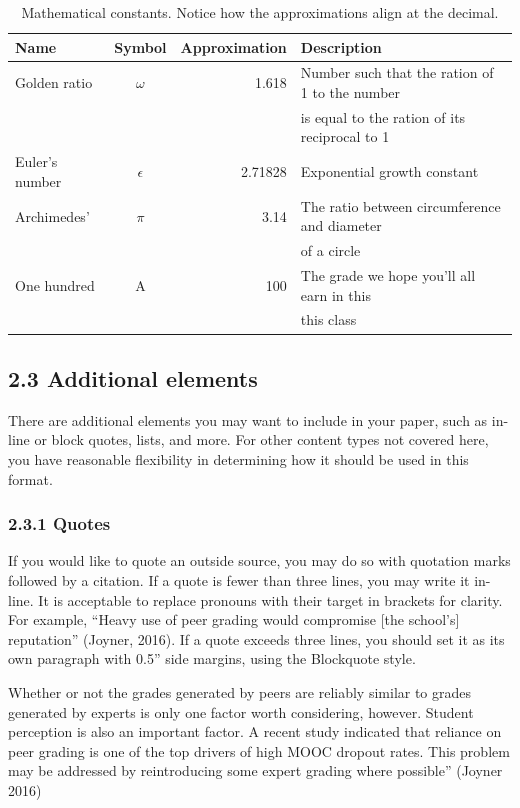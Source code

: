 {{{{\begin{table}[H]
  \centering
  \caption{Mathematical constants. Notice how the approximations align at the decimal.}
  \label{table:1}
  \footnotesize
  \begin{tabular}{l|c|r|l}
    \textbf{Name} & \textbf{Symbol} & \textbf{Approximation} & \textbf{Description}\\
    \hline
    Golden ratio & $\omega$ & 1.618 & Number such that the ration of 1 to the number\\
    & & & is equal to the ration of its reciprocal to 1\\
    \hline
    Euler's number & $\epsilon$ & 2.71828 & Exponential growth constant\\
    \hline
    Archimedes' & $\pi$ & 3.14 & The ratio between circumference and diameter\\
    & & & of a circle\\
    \hline
    One hundred & A\super{+} & 100 & The grade we hope you'll all earn in this\\
    & & & this class
  \end{tabular}
\end{table}

\subsection*{2.3 Additional elements}
There are additional elements you may want to include in your paper, such as in-line or block quotes, lists, and more. For other content types not covered here, you have reasonable flexibility in determining how it should be used in this format.

\subsubsection*{2.3.1 Quotes}
If you would like to quote an outside source, you may do so with quotation marks followed by a citation. If a quote is fewer than three lines, you may write it in-line. It is acceptable to replace pronouns with their target in brackets for clarity. For example, “Heavy use of peer grading would compromise [the school’s] reputation” (Joyner, 2016). If a quote exceeds three lines, you should set it as its own paragraph with 0.5'' side margins, using the Blockquote style.

\begin{quoting}
Whether or not the grades generated by peers are reliably similar to grades
generated by experts is only one factor worth considering, however. Student
perception is also an important factor. A recent study indicated that reliance
on peer grading is one of the top drivers of high MOOC dropout rates. This
problem may be addressed by reintroducing some expert grading where possible''
(Joyner 2016)
\end{quoting}

}}}}
